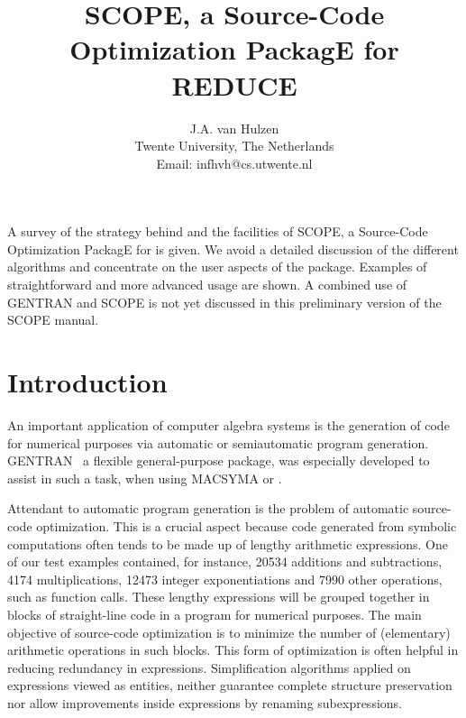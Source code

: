 \title{SCOPE, a Source-Code Optimization PackagE for REDUCE}
\date{}
\author{J.A. van Hulzen \\ Twente University, The Netherlands \\
Email: infhvh@cs.utwente.nl}

\maketitle
{}

A survey of the strategy behind and the facilities of SCOPE, a
Source-Code Optimization PackagE for {\REDUCE} is given. We avoid a
detailed discussion of the different algorithms and concentrate on the
user aspects of the package.  Examples of straightforward and more
advanced usage are shown.  A combined use of GENTRAN and SCOPE is not
yet discussed in this preliminary version of the SCOPE manual.

\section{Introduction}\label{SCOPE:intro}

An important application of computer algebra systems is the generation
of code for numerical purposes via automatic or semiautomatic program
generation. GENTRAN~\cite{Gates:85,Gates:84} a flexible general-purpose
package, was especially developed to assist in such a task, when using
MACSYMA or {\REDUCE}.

Attendant to automatic program generation is the problem of automatic
source-code optimization. This is a crucial aspect because code
generated from symbolic computations often tends to be made up of
lengthy arithmetic expressions. One of our test examples contained,
for instance, 20534 additions and subtractions, 4174 multiplications,
12473 integer exponentiations and 7990 other operations, such as
function calls.  These lengthy expressions will be grouped together in
blocks of straight-line code in a program for numerical purposes. The
main objective of source-code optimization is to minimize the number
of (elementary) arithmetic operations in such blocks.  This form of
optimization is often helpful in reducing redundancy in expressions.
Simplification algorithms applied on expressions viewed as entities,
neither guarantee complete structure preservation nor allow
improvements inside expressions by renaming subexpressions.

